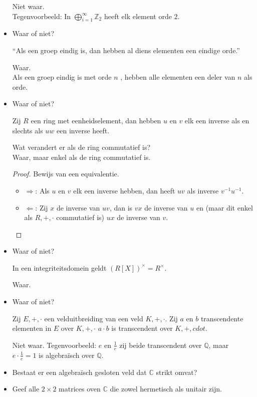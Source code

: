 \documentclass[main.tex]{subfiles}
\begin{document}
\begin{itemize}
   Niet waar.\\
   Tegenvoorbeeld: In $\bigoplus_{i=1}^{\infty}\mathbb{Z}_{2}$ heeft elk element orde $2$.
 \item Waar of niet?
   \begin{center}
     ``Als een groep eindig is, dan hebben al diens elementen een eindige orde.''
   \end{center}
   Waar.\\
   Als een groep eindig is met orde $n$ , hebben alle elementen een deler van $n$ als orde.
 \item Waar of niet?
   \begin{center}
     Zij $R$ een ring met eenheidselement, dan hebben $u$ en $v$ elk een inverse als en slechts als $uw$ een inverse heeft.
   \end{center}
   Wat verandert er als de ring commutatief is?\\
   Waar, maar enkel als de ring commutatief is.
   \begin{proof}
     Bewijs van een equivalentie.
     \begin{itemize}
     \item $\Rightarrow$: Als $u$ en $v$ elk een inverse hebben, dan heeft $uv$ als inverse $v^{-1}u^{-1}$.
     \item $\Leftarrow$: Zij $x$ de inverse van $uv$, dan is $vx$ de inverse van $u$ en (maar dit enkel als $R,+,\cdot$ commutatief is) $ux$ de inverse van $v$.
     \end{itemize}
   \end{proof}
 \item Waar of niet?
   \begin{center}
     In een integriteitsdomein geldt $(R[X])^{\times} = R^{\times}$.
   \end{center}
   Waar.
 \item Waar of niet?
   \begin{center}
     Zij $E,+,\cdot$ een velduitbreiding van een veld $K,+,\cdot$. 
     Zij $a$ en $b$ transcendente elementen in $E$ over $K,+,\cdot$
     $a\cdot b$ is transcendent over $K,+,cdot$.
   \end{center}
   Niet waar. Tegenvoorbeeld: $e$ en $\frac{1}{e}$ zij beide transcendent over $\mathbb{Q}$, maar $e \cdot \frac{1}{e}=1$ is algebra\"isch over $\mathbb{Q}$.
 \item Bestaat er een algebra\"isch gesloten veld dat $\mathbb{C}$ strikt omvat?
 \item Geef alle $2\times 2$ matrices oven $\mathbb{C}$ die zowel hermetisch als unitair zijn.

\end{itemize}
\end{document}
